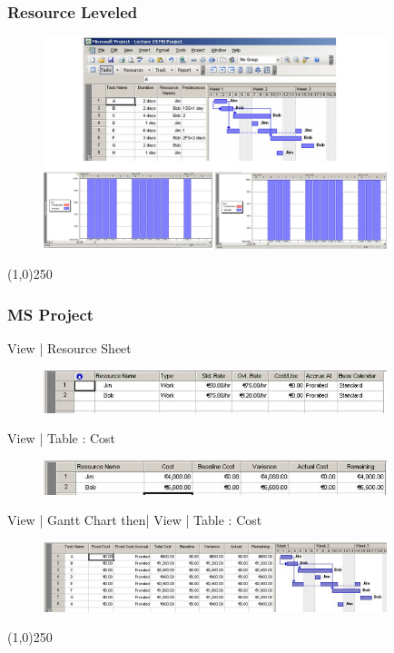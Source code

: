 \begin{frame}
\frametitle{Resource Leveled}
\begin{figure}
	\centering
		\includegraphics[width = 10cm]{images/resleveled.jpg}
	\label{fig:resleveled}
\end{figure}

\end{frame}
\begin{center}\line(1,0){250}\end{center}






\begin{frame}
\frametitle{MS Project}
View | Resource Sheet\\\begin{figure}
	\centering
		\includegraphics[width = 10cm]{images/ressheet.jpg}
	\label{fig:ressheet}
\end{figure}


View | Table : Cost\\\begin{figure}
	\centering
		\includegraphics[width = 10cm]{images/costsheet.jpg}
	\label{fig:costsheet}
\end{figure}


View | Gantt Chart then| View | Table : Cost\\\begin{figure}
	\centering
		\includegraphics[width = 10cm]{images/ganttcost.jpg}
	\label{fig:ganttcost}
\end{figure}
\end{frame}
\begin{center}\line(1,0){250}\end{center}







